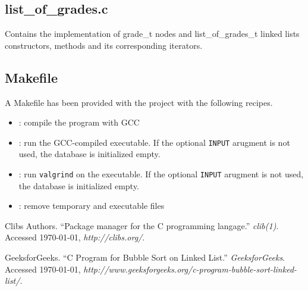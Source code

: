 \documentclass[usletter, 12pt]{article}
\begin{document}
        \subsection{list\_of\_grades.c} Contains the implementation of grade\_t
        nodes and list\_of\_grades\_t linked lists constructors, methods and
        its corresponding iterators.

        \subsection{Makefile} A Makefile has been provided with the project
        with the following recipes.
        \begin{itemize}

            \item {}: compile the program with GCC

            \item {}: run the GCC-compiled
            executable. If the optional \texttt{INPUT} arugment is not used,
            the database is initialized empty.

            \item {}: run \texttt{valgrind}
            on the executable. If the optional \texttt{INPUT} arugment is not
            used, the database is initialized empty.

            \item {}: remove temporary and executable files 

        \end{itemize}

    \begin{thebibliography}{9}
         Clibs Authors. ``Package manager for the C programming
        langage.'' \textit{clib(1)}. Accessed \today,
        \textit{http://clibs.org/}.

         GeeksforGeeks. ``C Program for Bubble Sort on Linked
        List.'' \textit{GeeksforGeeks}. Accessed \today,
        \textit{http://www.geeksforgeeks.org/c-program-bubble-sort-linked-
        list/}.
    \end{thebibliography}
\end{document}

